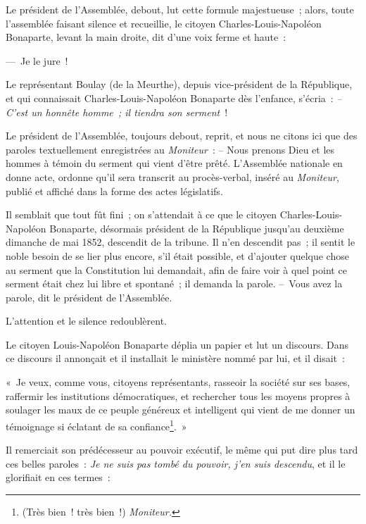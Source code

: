 \documentclass[french,twoside]{book} %
\newenvironment{quoteblock}%
  {\begin{quoting}}
  {\end{quoting}}
\newenvironment{quotebar}{%
    \def\FrameCommand{{\color{rubric!10!}\vrule width 0.5em} \hspace{0.9em}}%
    \def\OuterFrameSep{\itemsep} %
    \MakeFramed {\advance\hsize-\width \FrameRestore}
  }%
  {%
    \endMakeFramed
  }
\renewenvironment{quoteblock}%
  {%
    \savenotes
    \setstretch{0.9}
    \normalfont
    \begin{quotebar}
  }
  {%
    \end{quotebar}
    \spewnotes
  }
\begin{document}
\noindent Le président de l’Assemblée, debout, lut cette formule majestueuse ; alors, toute l’assemblée faisant silence et recueillie, le citoyen Charles-Louis-Napoléon Bonaparte, levant la main droite, dit d’une voix ferme et haute :\par
— Je le jure !\par
Le représentant Boulay (de la Meurthe), depuis vice-président de la République, et qui connaissait Charles-Louis-Napoléon Bonaparte dès l’enfance, s’écria : \emph{– C’est un honnête homme ; il tiendra son serment} !\par
Le président de l’Assemblée, toujours debout, reprit, et nous ne citons ici que des paroles textuellement enregistrées au \emph{Moniteur} : – Nous prenons Dieu et les hommes à témoin du serment qui vient d’être prêté. L’Assemblée nationale en donne acte, ordonne qu’il sera transcrit au procès-verbal, inséré au \emph{Moniteur}, publié et affiché dans la forme des actes législatifs.\par
Il semblait que tout fût fini ; on s’attendait à ce que le citoyen Charles-Louis-Napoléon Bonaparte, désormais président de la République jusqu’au deuxième dimanche de mai 1852, descendit de la tribune. Il n’en descendit pas ; il sentit le noble besoin de se lier plus encore, s’il était possible, et d’ajouter quelque chose au serment que la Constitution lui demandait, afin de faire voir à quel point ce serment était chez lui libre et spontané ; il demanda la parole. – Vous avez la parole, dit le président de l’Assemblée.\par
L’attention et le silence redoublèrent.\par
Le citoyen Louis-Napoléon Bonaparte déplia un papier et lut un discours. Dans ce discours il annonçait et il installait le ministère nommé par lui, et il disait :\par

\begin{quoteblock}
 \noindent « Je veux, comme vous, citoyens représentants, rasseoir la société sur ses bases, raffermir les institutions démocratiques, et rechercher tous les moyens propres à soulager les maux de ce peuple généreux et intelligent qui vient de me donner un témoignage si éclatant de sa confiance\footnote{(Très bien ! très bien !) \emph{Moniteur.}}. »
 \end{quoteblock}

\noindent Il remerciait son prédécesseur au pouvoir exécutif, le même qui put dire plus tard ces belles paroles : \emph{Je ne suis pas tombé du pouvoir, j’en suis descendu}, et il le glorifiait en ces termes :\par
\end{document}
